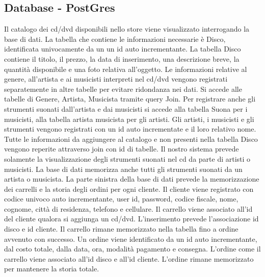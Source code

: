\documentclass[a4paper,titlepage]{book}
\begin{document}
\subsection{Database -  PostGres}
Il catalogo dei cd/dvd disponibili nello store viene visualizzato interrogando la base di dati. La tabella che contiene le informazioni necessarie \`e Disco, identificata univocamente da un un id auto incrementante. La tabella Disco contiene il titolo, il prezzo, la data di inserimento, una descrizione breve, la quantit\`a disponibile e una foto relativa all'oggetto. Le informazioni relative al genere, all'artista e ai musicisti interpreti nel cd/dvd vengono registrati separatemente in altre tabelle per evitare ridondanza nei dati. Si accede alle tabelle di Genere, Artista, Musicista tramite query Join. Per registrare anche gli strumenti suonati dall'artista e dai musicisti si accede alla tabella Suona per i musicisti, alla tabella artista musicista per gli artisti. Gli artisti, i musicisti e gli strumenti vengono registrati con un id auto incrementate e il loro relativo nome. Tutte le informazioni da aggiungere al catalogo e non presenti nella tabella Disco vengono reperite attraverso join con id di tabelle.
Il nostro sistema prevede solamente la visualizzazione degli strumenti suonati nel cd da parte di artisti o musicisti. La base di dati memorizza anche tutti gli strumenti suonati da un artista o musicista.
La parte sinistra della base di dati prevede la memorizzazione dei carrelli e la storia degli ordini per ogni cliente. Il cliente viene registrato con codice univoco auto incrementante, user id, password, codice fiscale, nome, cognome, città di residenza, telefono e cellulare. Il carrello viene associato all'id del cliente qualora si aggiunga un cd/dvd. L'inserimento prevede l'associazione id disco e id cliente. Il carrello rimane memorizzato nella tabella fino a ordine avvenuto con successo. Un ordine viene identificato da un id auto incrementante, dal costo totale, dalla data, ora, modalit\`a pagamento e consegna. L'ordine come il carrello viene associato all'id disco e all'id cliente. L'ordine rimane memorizzato per mantenere la storia totale.
\end{document}
